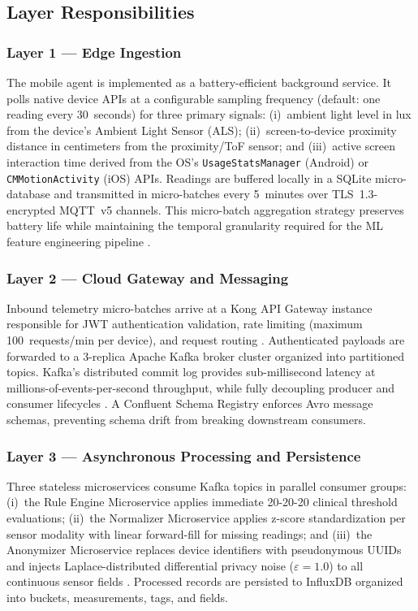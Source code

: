 \documentclass[conference]{IEEEtran}
\begin{document}
\subsection{Layer Responsibilities}

\subsubsection{Layer 1 — Edge Ingestion}

The mobile agent is implemented as a battery-efficient background service. It polls
native device APIs at a configurable sampling frequency (default: one reading every
30~seconds) for three primary signals: (i)~ambient light level in lux from the device's
Ambient Light Sensor (ALS); (ii)~screen-to-device proximity distance in centimeters
from the proximity/ToF sensor; and (iii)~active screen interaction time derived from the
OS's \texttt{UsageStatsManager} (Android) or \texttt{CMMotionActivity} (iOS) APIs.
Readings are buffered locally in a SQLite micro-database and transmitted in micro-batches
every 5~minutes over TLS~1.3-encrypted MQTT~v5 channels. This micro-batch aggregation
strategy preserves battery life while maintaining the temporal granularity required
for the ML feature engineering pipeline \cite{b8}.

\subsubsection{Layer 2 — Cloud Gateway and Messaging}

Inbound telemetry micro-batches arrive at a Kong API Gateway instance responsible for
JWT authentication validation, rate limiting (maximum 100~requests/min per device),
and request routing \cite{b9}. Authenticated payloads are forwarded to a 3-replica
Apache Kafka broker cluster organized into partitioned topics. Kafka's distributed
commit log provides sub-millisecond latency at millions-of-events-per-second throughput,
while fully decoupling producer and consumer lifecycles \cite{b10}. A Confluent Schema
Registry enforces Avro message schemas, preventing schema drift from breaking downstream
consumers.

\subsubsection{Layer 3 — Asynchronous Processing and Persistence}

Three stateless microservices consume Kafka topics in parallel consumer groups:
(i)~the Rule Engine Microservice applies immediate 20-20-20 clinical threshold
evaluations; (ii)~the Normalizer Microservice applies z-score standardization per
sensor modality with linear forward-fill for missing readings; and (iii)~the Anonymizer
Microservice replaces device identifiers with pseudonymous UUIDs and injects
Laplace-distributed differential privacy noise ($\varepsilon = 1.0$) to all continuous
sensor fields \cite{b11}. Processed records are persisted to InfluxDB organized into
buckets, measurements, tags, and fields.
\end{document}
